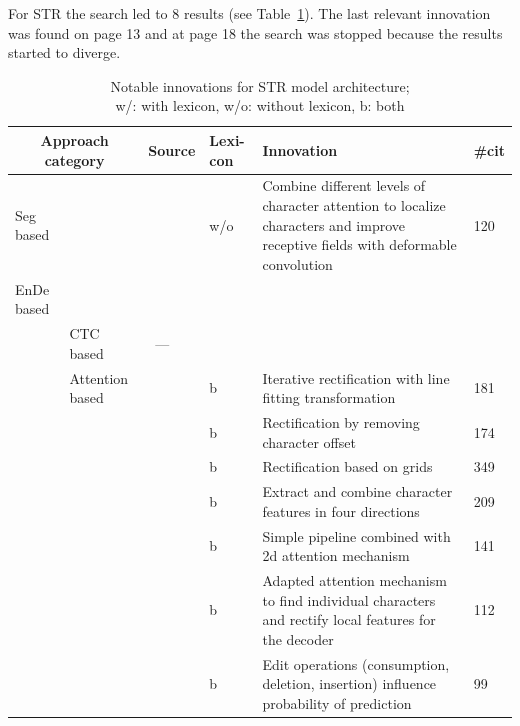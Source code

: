 For \ac{STR} the search led to 8 results (see Table~\ref{tb:STR-steps-properties}).
The last relevant innovation was found on page 13 and at page 18 the search was stopped because
the results started to diverge.
\begin{table}[h]
    \centering\scriptsize
    \begin{tabular}{p{}p{}p{}p{}
            p{}p{}}
        \multicolumn{2}{c}{Approach category} & Source & Lexi-con & Innovation & \#cit \\
        \toprule
        Seg based & &~\cite{liao_scene_2018} & w/o & Combine different levels of character attention
            to localize characters and improve receptive fields with deformable convolution & 120 \\
        \midrule
        \ac{EnDe} based & & & \\
            & CTC based &~--- & & \\
            & Attention based &~\cite{zhan_esir_2019} & b & Iterative rectification with line fitting
                transformation & 181 \\
            & &~\cite{luo_multi-object_2019} & b & Rectification by removing character offset & 174 \\
            & &~\cite{shi_aster_2019} & b & Rectification based on grids & 349 \\
            & &~\cite{cheng_aon_2018} & b & Extract and combine character features in four directions
                & 209 \\
            & &~\cite{li_show_2019} & b & Simple pipeline combined with 2d attention mechanism & 141 \\
            & &~\cite{liu_char-net_2018} & b & Adapted attention mechanism to find
                individual characters and rectify local features for the decoder & 112 \\
            & &~\cite{bai_edit_2018} & b & Edit operations (consumption, deletion, insertion)
                influence probability of prediction & 99 \\
        \bottomrule
    \end{tabular}
    \caption[Notable innovations for STR model architecture]{%
        Notable innovations for STR model architecture; \\
        w/: with lexicon, w/o: without lexicon, b: both\label{tb:STR-steps-properties}
    }
\end{table}
